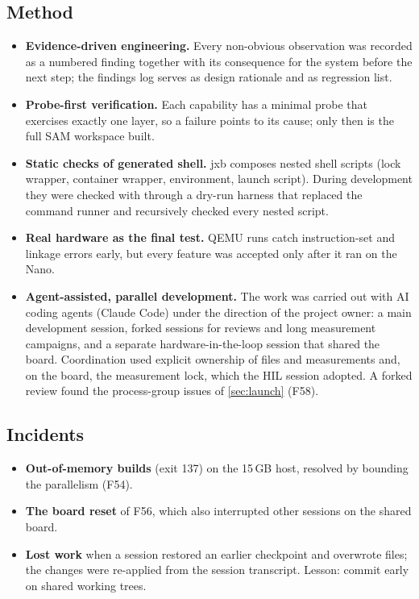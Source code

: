 \documentclass[11pt,a4paper]{article}
\newcommand{\jxb}{\textsf{jxb}}
\newcommand{\finding}[1]{\textsf{\small F#1}}
\begin{document}
\subsection{Method}
\begin{itemize}
  \item \textbf{Evidence-driven engineering.} Every non-obvious observation was recorded as a numbered finding together
        with its consequence for the system before the next step; the findings log serves as design rationale and as
        regression list.
  \item \textbf{Probe-first verification.} Each capability has a minimal probe that exercises exactly one layer, so a
        failure points to its cause; only then is the full SAM workspace built.
  \item \textbf{Static checks of generated shell.} \jxb{} composes nested shell scripts (lock wrapper, container wrapper,
        environment, launch script). During development they were checked with  through a dry-run harness
        that replaced the command runner and recursively checked every nested  script.
  \item \textbf{Real hardware as the final test.} QEMU runs catch instruction-set and linkage errors early, but every
        feature was accepted only after it ran on the Nano.
  \item \textbf{Agent-assisted, parallel development.} The work was carried out with AI coding agents (Claude Code) under
        the direction of the project owner: a main development session, forked sessions for reviews and long
        measurement campaigns, and a separate hardware-in-the-loop session that shared the board. Coordination used
        explicit ownership of files and measurements and, on the board, the measurement lock, which the HIL session
        adopted. A forked review found the process-group issues of \cref{sec:launch} (\finding{58}).
\end{itemize}

\subsection{Incidents}
\begin{itemize}
  \item \textbf{Out-of-memory builds} (exit 137) on the 15\,GB host, resolved by bounding the parallelism (\finding{54}).
  \item \textbf{The board reset} of \finding{56}, which also interrupted other sessions on the shared board.
  \item \textbf{Lost work} when a session restored an earlier checkpoint and overwrote files; the changes were re-applied
        from the session transcript. Lesson: commit early on shared working trees.
\end{itemize}
\end{document}
